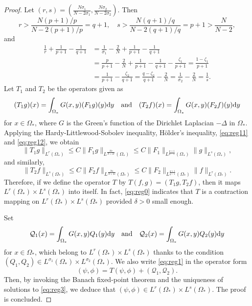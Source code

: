 \documentclass[reqno]{amsart}
\theoremstyle{remark}
\newcommand{\mcq}{\mathcal{Q}}
\newcommand{\dy}{\textup{d}y}
\newcommand{\oms}{\Omega_*}
\renewcommand{\(}{\left(}
\renewcommand{\)}{\right)}
\numberwithin{equation}{section}
\begin{document}
\begin{proof}
Let $(r,s) = (\frac{N\sigma_1}{N-2\sigma_1}, \frac{N\sigma_2}{N-2\sigma_2})$. Then
\begin{equation}\label{eq:reg11}
r > \frac{N(p+1)/p}{N-2(p+1)/p} = q+1,\quad s > \frac{N(q+1)/q}{N-2(q+1)/q} = p+1 > \frac{N}{N-2},
\end{equation}
and
\begin{equation}\label{eq:reg12}
\begin{aligned}
\frac{1}{r} + \frac{1}{p+1} - \frac{1}{q+1} &= \frac{1}{\sigma_1} - \frac{2}{N} + \frac{1}{p+1} - \frac{1}{q+1} \\
&= \frac{p}{p+1} - \frac{2}{N} + \frac{1}{p+1} - \frac{1}{q+1} - \frac{\zeta_1}{p+1} = \frac{1-\zeta_1}{p+1} \\
&= \frac{1}{p+1} - \frac{\zeta_2}{q+1} = \frac{q-\zeta_2}{q+1} - \frac{2}{N} = \frac{1}{\sigma_2} - \frac{2}{N} = \frac{1}{s}.
\end{aligned}
\end{equation}
Let $T_1$ and $T_2$ be the operators given as
\[(T_1g)(x) = \int_{\oms} G(x,y) (F_1g)(y)\dy \quad \textup{and} \quad (T_2f)(x) = \int_{\oms} G(x,y) (F_2f)(y)\dy\]
for $x \in \oms$, where $G$ is the Green's function of the Dirichlet Laplacian $-\Delta$ in $\oms$.
Applying the Hardy-Littlewood-Sobolev inequality, H\"older's inequality, \eqref{eq:reg11} and \eqref{eq:reg12}, we obtain
\[\|T_1g\|_{L^r(\oms)} \le C\|F_1g\|_{L^{\frac{Nr}{N+2r}}(\oms)} \le C\|F_1\|_{L^{\frac{p+1}{p-1}}(\oms)}\|g\|_{L^s(\oms)},\]
and similarly,
\[\|T_2f\|_{L^s(\oms)} \le C\|F_2f\|_{L^{\frac{Ns}{N+2s}}(\oms)} \le C\|F_2\|_{L^{\frac{q+1}{q-1}}(\oms)}\|f\|_{L^r(\oms)}.\]
Therefore, if we define the operator $T$ by $T(f,g) = (T_1g, T_2f)$, then it maps $L^r(\oms) \times L^s(\oms)$ into itself.
In fact, \eqref{eq:reg0} indicates that $T$ is a contraction mapping on $L^r(\oms) \times L^s(\oms)$ provided $\delta > 0$ small enough.

Set
\[\mcq_1(x) = \int_{\oms} G(x,y) Q_1(y)\dy \quad \textup{and} \quad \mcq_2(x) = \int_{\oms} G(x,y) Q_2(y)\dy\]
for $x \in \oms$, which belong to $L^r(\oms) \times L^s(\oms)$ thanks to the condition $(Q_1, Q_2) \in L^{\sigma_1}(\oms) \times L^{\sigma_2}(\oms)$.
We also write \eqref{eq:reg1} in the operator form
\begin{equation}\label{eq:reg3}
(\psi,\phi) = T(\psi,\phi) + (\mcq_1,\mcq_2).
\end{equation}
Then, by invoking the Banach fixed-point theorem and the uniqueness of solutions to \eqref{eq:reg3}, we deduce that $(\psi, \phi) \in L^r(\oms) \times L^s(\oms)$. The proof is concluded.
\end{proof}
\end{document}
